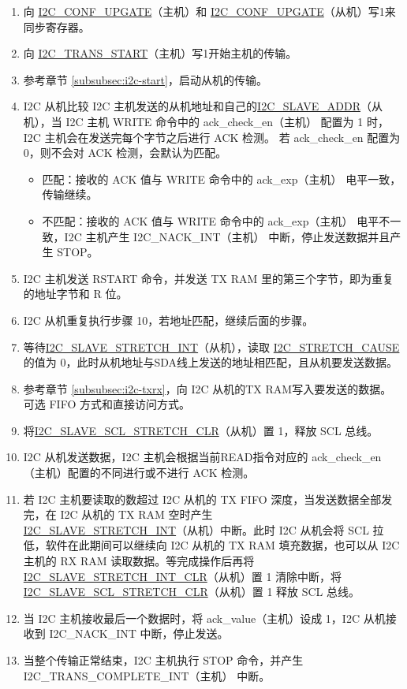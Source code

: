 \documentclass[main\_\_CN.tex]{subfiles}
\begin{document}
\begin{enumerate}
\item 向 \hyperref[fielddesc:I2CCONFUPGATE]{I2C\_CONF\_UPGATE}（主机）和 \hyperref[fielddesc:I2CCONFUPGATE]{I2C\_CONF\_UPGATE}（从机）写1来同步寄存器。
\item 向 \hyperref[fielddesc:I2CTRANSSTART]{I2C\_TRANS\_START}（主机）写1开始主机的传输。
\item 参考章节 \ref{subsubsec:i2c-start}，启动从机的传输。
\item I2C 从机比较 I2C 主机发送的从机地址和自己的\hyperref[fielddesc:I2CSLAVEADDR]{I2C\_SLAVE\_ADDR}（从机），当 I2C 主机 WRITE 命令中的 ack\_check\_en（主机） 配置为 1 时，I2C 主机会在发送完每个字节之后进行 ACK 检测。 若 ack\_check\_en 配置为 0，则不会对 ACK 检测，会默认为匹配。
\begin{itemize}
\item 匹配：接收的 ACK 值与 WRITE 命令中的 ack\_exp（主机） 电平一致，传输继续。
\item 不匹配：接收的 ACK 值与 WRITE 命令中的 ack\_exp（主机） 电平不一致，I2C 主机产生 I2C\_NACK\_INT（主机） 中断，停止发送数据并且产生 STOP。
\end{itemize}

\item I2C 主机发送 RSTART 命令，并发送 TX RAM 里的第三个字节，即为重复的地址字节和 R 位。
\item I2C 从机重复执行步骤 10，若地址匹配，继续后面的步骤。


\item 等待\hyperref[int:i2c-slave-stretch]{I2C\_SLAVE\_STRETCH\_INT}（从机），读取 \hyperref[fielddesc:I2CSTRETCHCAUSE]{I2C\_STRETCH\_CAUSE} 的值为 0，此时从机地址与SDA线上发送的地址相匹配，且从机要发送数据。
\item 参考章节 \ref{subsubsec:i2c-txrx}，向 I2C 从机的TX RAM写入要发送的数据。可选 FIFO 方式和直接访问方式。
\item 将\hyperref[fielddesc:I2CSLAVESCLSTRETCHCLR]{I2C\_SLAVE\_SCL\_STRETCH\_CLR}（从机）置 1，释放 SCL 总线。


\item I2C 从机发送数据，I2C 主机会根据当前READ指令对应的 ack\_check\_en（主机）配置的不同进行或不进行 ACK 检测。
\item 若 I2C 主机要读取的数超过 I2C 从机的 TX FIFO 深度，当发送数据全部发完，在 I2C 从机的 TX RAM 空时产生 \\\hyperref[int:i2c-slave-stretch]{I2C\_SLAVE\_STRETCH\_INT}（从机）中断。此时 I2C 从机会将 SCL 拉低，软件在此期间可以继续向 I2C 从机的 TX RAM 填充数据，也可以从 I2C 主机的 RX RAM 读取数据。等完成操作后再将 \hyperref[fielddesc:I2CSLAVESTRETCHINTCLR]{I2C\_SLAVE\_STRETCH\_INT\_CLR}（从机）置 1 清除中断，将\hyperref[fielddesc:I2CSLAVESCLSTRETCHCLR]{I2C\_SLAVE\_SCL\_STRETCH\_CLR}（从机）置 1 释放 SCL 总线。

\item 当 I2C 主机接收最后一个数据时，将 ack\_value（主机）设成 1，I2C 从机接收到 I2C\_NACK\_INT 中断，停止发送。

\item 当整个传输正常结束，I2C 主机执行 STOP 命令，并产生 I2C\_TRANS\_COMPLETE\_INT（主机） 中断。
\end{enumerate}
\end{document}
